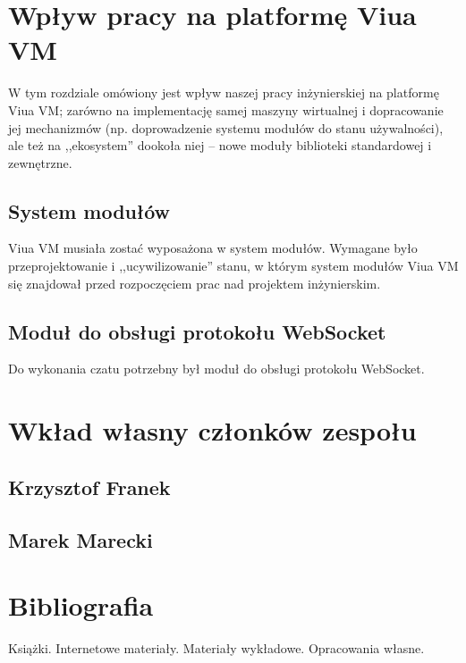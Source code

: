 \documentclass[11pt,oneside,a4paper,titlepage,onecolumn]{book}
\begin{document}


\chapter{Wpływ pracy na platformę Viua VM}

W tym rozdziale omówiony jest wpływ naszej pracy inżynierskiej na platformę Viua VM; zarówno na implementację
samej maszyny wirtualnej i dopracowanie jej mechanizmów (np. doprowadzenie systemu modułów do stanu
używalności), ale też na ,,ekosystem'' dookoła niej -- nowe moduły biblioteki standardowej i zewnętrzne.

\section{System modułów}

Viua VM musiała zostać wyposażona w system modułów. Wymagane było przeprojektowanie i ,,ucywilizowanie''
stanu, w którym system modułów Viua VM się znajdował przed rozpoczęciem prac nad projektem inżynierskim.

\section{Moduł do obsługi protokołu WebSocket}

Do wykonania czatu potrzebny był moduł do obsługi protokołu WebSocket.

\chapter{Wkład własny członków zespołu}
\label{wklad_wlasny_czlonkow_zespolu}

\section{Krzysztof Franek}

\section{Marek Marecki}



\chapter{Bibliografia}

Książki. Internetowe materiały. Materiały wykładowe. Opracowania własne.
\end{document}
